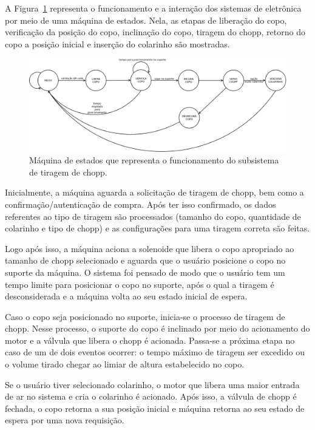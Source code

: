 A Figura~\ref{state_machine} representa o funcionamento e a interação dos sistemas de eletrônica por meio
de uma máquina de estados. Nela, as etapas de liberação do copo, verificação da posição do copo, inclinação do copo,
tiragem do chopp, retorno do copo a posição inicial e inserção do colarinho são mostradas.

\begin{figure}[!htb]
            \centering
         	\includegraphics[scale= 0.25]{figuras/maquina_estado_eletronica.png}
            \caption{Máquina de estados que representa o funcionamento do subsistema de tiragem de chopp.}
            \label{state_machine}
\end{figure}
 
Inicialmente, a máquina aguarda a solicitação de tiragem de chopp, bem como a confirmação/autenticação de compra. 
Após ter isso confirmado, os dados referentes ao tipo de tiragem são processados (tamanho do copo, quantidade de colarinho
e tipo de chopp) e as configurações para uma tiragem correta são feitas.

Logo após isso, a máquina aciona a solenoide que libera o copo apropriado ao tamanho de chopp selecionado e aguarda que o 
usuário  posicione o copo no suporte da máquina. O  sistema foi pensado de modo que o usuário tem um tempo limite para
posicionar o copo no suporte, após o qual a tiragem é desconsiderada e a máquina volta ao seu estado inicial de espera.

Caso o copo seja posicionado no suporte, inicia-se o processo de tiragem de chopp. Nesse processo, o suporte do copo é
inclinado por meio do acionamento do motor e a válvula que libera o chopp é acionada. Passa-se a próxima etapa no caso de um
de dois eventos ocorrer: o tempo máximo de tiragem ser excedido ou o 
volume tirado chegar ao limiar de altura estabelecido no copo.

Se o usuário tiver selecionado colarinho, o motor que libera uma maior entrada de ar no sistema e cria o colarinho é 
acionado. Após isso, a válvula de chopp é fechada, o copo retorna a sua 
posição inicial e máquina retorna ao seu estado de espera por uma nova requisição.

